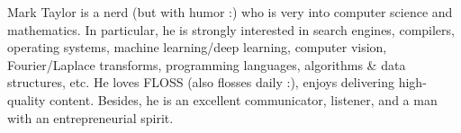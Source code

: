 \documentclass[9pt]{developercv} %
\begin{document}
\vspace{0.5cm}



\begin{minipage}[t]{0.4\textwidth} %
	\vspace{-\baselineskip} %
	Mark Taylor is a nerd (but with humor :) who is very into computer science
	and mathematics. In particular, he is strongly interested in
	search engines, compilers, operating systems, machine learning/deep learning,
	computer vision, Fourier/Laplace transforms, programming languages,
	algorithms \& data structures, etc.
	He loves FLOSS (also flosses daily :), enjoys delivering high-quality content.
	Besides, he is
	an excellent communicator, listener, and a man with an entrepreneurial spirit.
\end{minipage}
\hfill %
\begin{minipage}[t]{0.5\textwidth} %
	\vspace{-\baselineskip} %
	\begin{barchart}{5.5}
	\end{barchart}
\end{minipage}

\begin{center}
\end{center}


\end{document}

